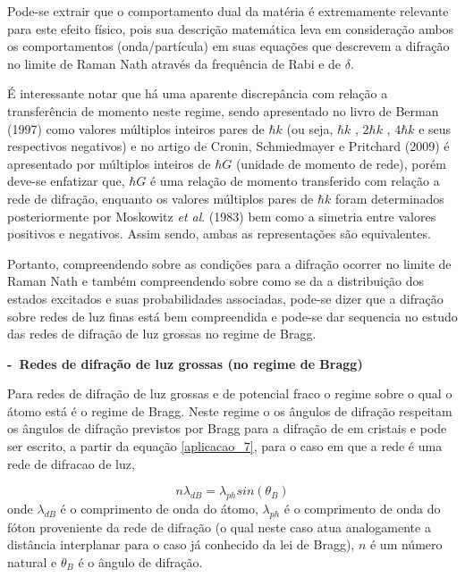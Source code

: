 			Pode-se extrair que o comportamento dual da matéria é extremamente relevante para este efeito físico, pois sua descrição matemática leva em consideração ambos os comportamentos (onda/partícula) em suas equações que descrevem a difração no limite de Raman Nath através da frequência de Rabi e de $\delta$.
		
			\par É interessante notar que há uma aparente discrepância com relação a transferência de momento neste regime, sendo apresentado no livro de Berman (1997) como valores múltiplos inteiros pares de $\hbar k$ (ou seja, $\hbar k$ , $2 \hbar k$ , $4 \hbar k$  e seus respectivos negativos) e no artigo de Cronin, Schmiedmayer e Pritchard (2009) é apresentado por múltiplos inteiros de $\hbar G$ (unidade de momento de rede), porém deve-se enfatizar que, $\hbar G$ é uma relação  de momento transferido com relação a rede de difração, enquanto os valores múltiplos pares de $\hbar k$  foram determinados posteriormente por Moskowitz \textit{et al}. (1983) bem como a simetria entre valores positivos e negativos. Assim sendo, ambas as representações são equivalentes.
		
			\par Portanto, compreendendo sobre as condições para a difração ocorrer no limite de Raman Nath e também compreendendo sobre como se da a distribuição dos estados excitados e suas probabilidades associadas, pode-se dizer que a difração sobre redes de luz finas está bem compreendida e pode-se dar sequencia no estudo das redes de difração de luz grossas no regime de Bragg.

		\textbf{-\ Redes de difração de luz grossas (no regime de Bragg)}

			\par Para redes de difração de luz grossas e de potencial fraco o regime sobre o qual o átomo está é o regime de Bragg. Neste regime o os ângulos de difração respeitam os ângulos de difração previstos por Bragg para a difração de em cristais e pode ser escrito, a partir da equação \eqref{aplicacao_7}, para o caso em que a rede é uma rede de difracao de luz,

			\begin{equation}
				\label{aplicacao_7}
				n\lambda_{dB} = \lambda_{ph} sin(\theta_{B})
			\end{equation}
			onde $\lambda_{dB}$ é o comprimento de onda do átomo, $\lambda_{ph}$ é o comprimento de onda do fóton proveniente da rede de difração (o qual neste caso atua analogamente a distância interplanar para o caso já conhecido da lei de Bragg), $n$ é um número natural e $\theta_{B}$ é o ângulo de difração\cite{ricardo_5}.
	

